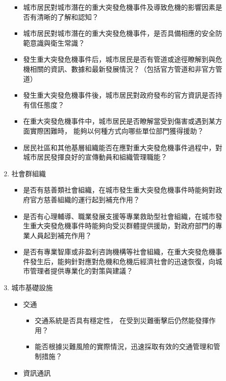 \documentclass[a4paper,12pt]{article}
\begin{document}
\begin{enumerate}
\begin{enumerate}
\begin{enumerate}
\begin{itemize}
\item 城市居民對城市潛在的重大突發危機事件及導致危機的影響因素是否有清晰的了解和認知？\\
\item 城市居民對城市潛在的重大突發危機事件，是否具備相應的安全防範意識與衛生常識？\\
\item 發生重大突發危機事件后，城市居民是否有管道或途徑瞭解到與危機相關的資訊、數據和最新發展情況？（包括官方管道和非官方管道）\\
\item 發生重大突發危機事件後，城市居民對政府發布的官方資訊是否持有信任態度？\\
\item 在重大突發危機事件中，城市居民是否瞭解當受到傷害或遇到某方面實際困難時， 能夠以何種方式向哪些單位部門獲得援助？\\
\item 居民社區和其他基層組織能否在應對重大突發危機事件過程中，對城市居民發揮良好的宣傳動員和組織管理職能？\\
\end{itemize}
\item 社會群組織
\label{sec:org7dba17f}
\begin{itemize}
\item 是否有慈善類社會組織，在城市發生重大突發危機事件時能夠對政府官方慈善組織的運行起到補充作用？\\
\item 是否有心理輔導、職業發展支援等專業救助型社會組織，在城市發生重大突發危機事件時能夠向受災群體提供援助，對政府部門的專業人員起到補充作用？\\
\item 是否有專業智庫或非盈利咨詢機構等社會組織，在重大突發危機事件發生后，能夠針對應對危機和危機后經濟社會的迅速恢復，向城市管理者提供專業化的對策與建議？\\
\end{itemize}
\item 城市基礎設施
\label{sec:org00b8b9d}
\begin{itemize}
\item 交通
\label{sec:org0b5427a}
\begin{itemize}
\item 交通系統是否具有穩定性， 在受到災難衝擊后仍然能發揮作用？\\
\item 能否根據災難風險的實際情況，迅速採取有效的交通管理和管制措施？\\
\end{itemize}
\item 資訊通訊

\end{itemize}
\end{enumerate}
\end{enumerate}
\end{enumerate}
\end{document}

